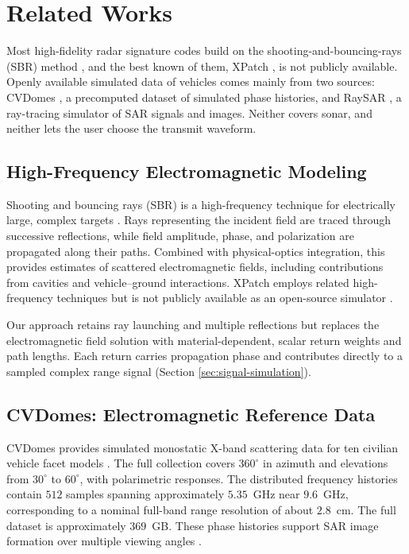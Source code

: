\documentclass[sensors,article,submit,moreauthors]{Definitions/mdpi}
\begin{document}
\section{Related Works}
\label{sec:related}

Most high-fidelity radar signature codes build on the shooting-and-bouncing-rays (SBR) method \cite{sbr}, and the best known of them, XPatch \cite{xpatch4}, is not publicly available.  Openly available simulated data of vehicles comes mainly from two sources: CVDomes \cite{cvdomes}, a precomputed dataset of simulated phase histories, and RaySAR \cite{raysar}, a ray-tracing simulator of SAR signals and images. Neither covers sonar, and neither lets the user choose the transmit waveform.

\subsection{High-Frequency Electromagnetic Modeling}
\label{sec:sbr}

Shooting and bouncing rays (SBR) is a high-frequency technique for electrically large, complex targets \cite{sbr}. Rays representing the incident field are traced through successive reflections, while field amplitude, phase, and polarization are propagated along their paths.  Combined with physical-optics integration, this provides estimates of scattered electromagnetic fields, including contributions from cavities and vehicle--ground interactions.  XPatch employs related high-frequency techniques but is not publicly available as an open-source simulator \cite{xpatch4}.

Our approach retains ray launching and multiple reflections but replaces the electromagnetic field solution with material-dependent, scalar return weights and path lengths. Each return carries propagation phase and contributes directly to a sampled complex range signal (Section \ref{sec:signal-simulation}).

\subsection{CVDomes: Electromagnetic Reference Data}
\label{sec:cvdomes}

CVDomes provides simulated monostatic X-band scattering data for ten civilian vehicle facet models \cite{cvdomes,cvdomesreport}. The full collection covers $360^\circ$ in azimuth and elevations from $30^\circ$ to $60^\circ$, with polarimetric responses. The distributed frequency histories contain $512$ samples spanning approximately $5.35$~GHz near $9.6$~GHz, corresponding to a nominal full-band range resolution of about $2.8$~cm. The full dataset is approximately $369$~GB. These phase histories support SAR image formation over multiple viewing angles \cite{gorham2010sar}.
\end{document}
